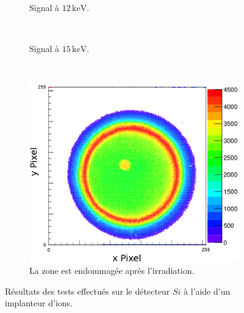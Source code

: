 \begin{figure}[!ht]
  \centering
  \begin{subfigure}[t]{0.275\textwidth}
    
    \caption[]{Signal à $12\,\mathrm{keV}$.}
    \label{sumfr:fig:IRMA_a}
  \end{subfigure}
  ~
  \begin{subfigure}[t]{0.275\textwidth}
    
    \caption[]{Signal à $15\,\mathrm{keV}$.}
    \label{sumfr:fig:IRMA_b}
  \end{subfigure}
  ~
  \begin{subfigure}[t]{0.33\textwidth}
    \includegraphics[width=\textwidth]{00_French/figures/fig000_IRMA_damage3_fr}
    \caption[]{La zone est endommagée après l'irradiation.}
    \label{sumfr:fig:IRMA_c}
  \end{subfigure}
  \caption[]{Résultats des tests effectués sur le détecteur $Si$ à l'aide d'un implanteur d'ions.}
  \label{sumfr:fig:IRMA}
\end{figure}